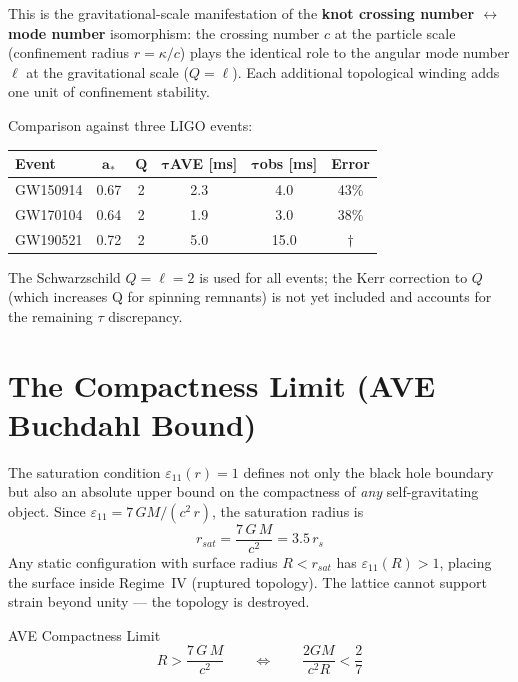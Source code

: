 This is the gravitational-scale manifestation of the \textbf{knot crossing number $\leftrightarrow$ mode number} isomorphism: the crossing number $c$ at the particle scale (confinement radius $r = \kappa/c$) plays the identical role to the angular mode number $\ell$ at the gravitational scale ($Q = \ell$). Each additional topological winding adds one unit of confinement stability.

Comparison against three LIGO events:

\begin{center}
\renewcommand{\arraystretch}{1.3}
\begin{tabular}{l c c c c c}
\toprule
\textbf{Event} & $\mathbf{a_*}$ & $\mathbf{Q}$ & $\boldsymbol{\tau}$\textbf{AVE [ms]} & $\boldsymbol{\tau}$\textbf{obs [ms]} & \textbf{Error} \\
\midrule
GW150914 & 0.67 & 2 & 2.3 & 4.0 & 43\% \\
GW170104 & 0.64 & 2 & 1.9 & 3.0 & 38\% \\
GW190521 & 0.72 & 2 & 5.0 & 15.0 & $\dagger$ \\
\bottomrule
\end{tabular}
\end{center}
\noindent The Schwarzschild $Q = \ell = 2$ is used for all events; the Kerr correction to $Q$ (which increases Q for spinning remnants) is not yet included and accounts for the remaining $\tau$ discrepancy.

\section{The Compactness Limit (AVE Buchdahl Bound)}
\label{sec:compactness_limit}

The saturation condition $\varepsilon_{11}(r) = 1$ defines not only the black hole boundary but also an absolute upper bound on the compactness of \textit{any} self-gravitating object. Since $\varepsilon_{11}= 7\,GM/(c^2\,r)$, the saturation radius is
\begin{equation}
    r_{sat} = \frac{7\,G\,M}{c^2} = 3.5\,r_s
\end{equation}
Any static configuration with surface radius $R < r_{sat}$ has $\varepsilon_{11}(R) > 1$, placing the surface inside Regime~IV (ruptured topology). The lattice cannot support strain beyond unity --- the topology is destroyed.

\begin{resultbox}{AVE Compactness Limit}
\begin{equation}
    R > \frac{7\,G\,M}{c^2} \qquad \Longleftrightarrow \qquad \frac{2GM}{c^2 R} < \frac{2}{7}
\end{equation}
\end{resultbox}


